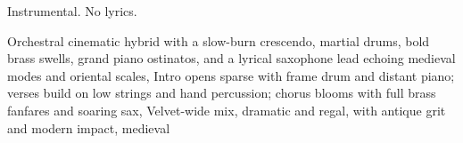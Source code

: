
\begin{notes}
Instrumental. No lyrics.
\end{notes}
\begin{prompt}
Orchestral cinematic hybrid with a slow-burn crescendo, martial drums, bold brass swells, grand piano ostinatos, and a lyrical saxophone lead echoing medieval modes and oriental scales, Intro opens sparse with frame drum and distant piano; verses build on low strings and hand percussion; chorus blooms with full brass fanfares and soaring sax, Velvet-wide mix, dramatic and regal, with antique grit and modern impact, medieval
\end{prompt}


